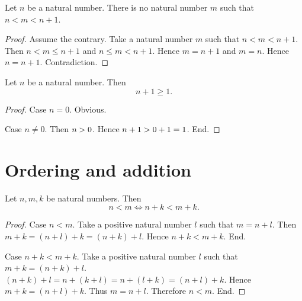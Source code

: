 \documentclass[../arithmetic.tex]{subfiles}
\begin{document}
  \begin{forthel}
    \begin{corollary}
      Let $n$ be a natural number.
      There is no natural number $m$ such that $n \less m \less n \plus 1$.
    \end{corollary}
    \begin{proof}
      Assume the contrary.
      Take a natural number $m$ such that $n \less m \less n \plus 1$.
      Then $n \less m \leq n \plus 1$ and $n \leq m \less n \plus 1$.
      Hence $m = n \plus 1$ and $m = n$.
      Hence $n = n \plus 1$.
      Contradiction.
    \end{proof}
  \end{forthel}

  \begin{forthel}
    \begin{proposition}
      Let $n$ be a natural number.
      Then \[ n \plus 1 \geq 1. \]
    \end{proposition}
    \begin{proof}
      Case $n = 0$. Obvious.

      Case $n \neq 0$.
        Then $n > 0$.
        Hence $n + 1 > 0 + 1 = 1$.
      End.
    \end{proof}
  \end{forthel}


  \section{Ordering and addition}

  \begin{forthel}
    \begin{proposition}
      Let $n, m, k$ be natural numbers.
      Then \[ n \less m \iff n \plus k \less m \plus k. \]
    \end{proposition}
    \begin{proof}
      Case $n \less m$.
        Take a positive natural number $l$ such that $m = n \plus l$.
        Then $m \plus k
          = (n \plus l) \plus k
          = (n \plus k) \plus l$.
        Hence $n \plus k \less m \plus k$.
      End.

      Case $n \plus k \less m \plus k$.
        Take a positive natural number $l$ such that $m \plus k = (n \plus k) \plus l$.
        $(n \plus k) \plus l
          = n \plus (k \plus l)
          = n \plus (l \plus k)
          = (n \plus l) \plus k$.
        Hence $m \plus k = (n \plus l) \plus k$.
        Thus $m = n \plus l$.
        Therefore $n \less m$.
      End.
    \end{proof}
  \end{forthel}
\end{document}
